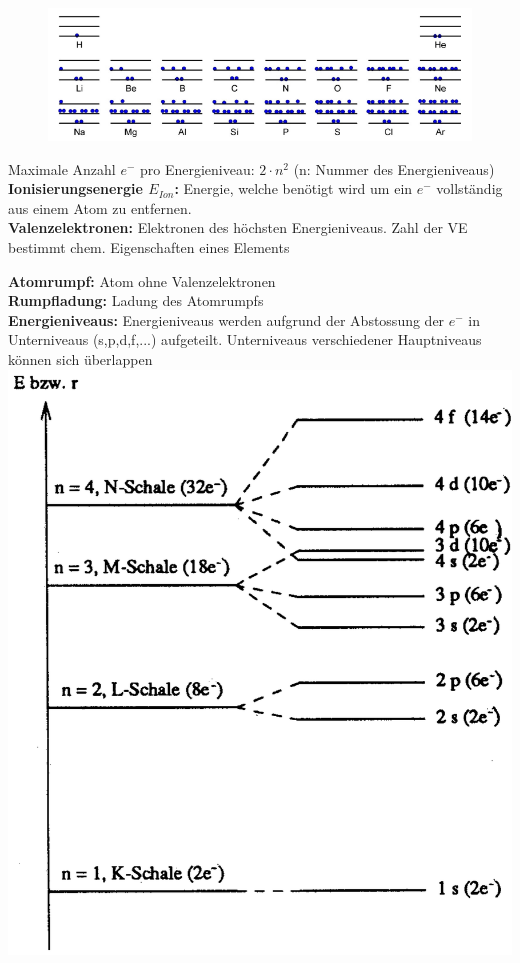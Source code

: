 \begin{figure}[htbp]
	\centering
	\includegraphics[width=0.9\linewidth]{images/2_Energie_der_Elektronen.png}
\end{figure}
Maximale Anzahl $e^-$ pro Energieniveau: $2 \cdot n^2$ (n: Nummer des Energieniveaus) \\
\textbf{Ionisierungsenergie $E_{Ion}$:} Energie, welche benötigt wird um ein $e^-$ vollständig aus einem Atom zu entfernen. \\
\textbf{Valenzelektronen:} Elektronen des höchsten Energieniveaus. Zahl der VE bestimmt chem. Eigenschaften eines Elements 
\begin{multicols}{2}
    \textbf{Atomrumpf:} Atom ohne Valenzelektronen \\
    \textbf{Rumpfladung:} Ladung des Atomrumpfs \\
    \textbf{Energieniveaus:} Energieniveaus werden aufgrund der Abstossung der $e^-$ in Unterniveaus (s,p,d,f,...) aufgeteilt. Unterniveaus verschiedener Hauptniveaus können sich überlappen
\columnbreak
	\includegraphics[width=1\linewidth]{images/2_Unterniveau.png}
\end{multicols}

